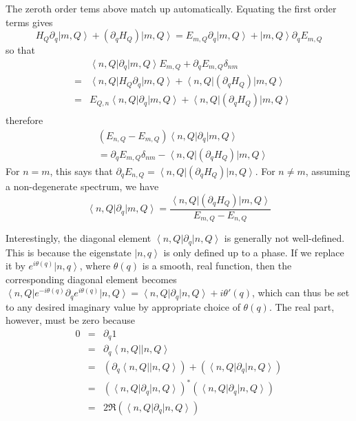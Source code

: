 \documentclass[aps,twocolumn,prb,floatfix,amsmath,amssymb,groupedaddress]{revtex4}
\begin{document}
The zeroth order tems above match up automatically.  Equating the first order terms gives
\[\!\!\!\!\!H_Q\partial_q\left|m,Q\right> + \left(\partial_qH_Q\right)\left|m,Q\right> = E_{m,Q}\partial_q\left|m,Q\right> + \left|m,Q\right>\partial_q E_{m,Q}\]
so that
\begin{eqnarray*}
& & \left<n,Q\right|\partial_q\left|m,Q\right> E_{m,Q} + \partial_q E_{m,Q} \delta_{nm} \\
& = & \left<n,Q\right|H_Q\partial_q\left|m,Q\right> + \left<n,Q\right|\left(\partial_q H_Q\right)\left|m,Q\right> \\
& = & E_{Q,n}\left<n,Q\right|\partial_q\left|m,Q\right> + \left<n,Q\right|\left(\partial_q H_Q\right)\left|m,Q\right> \\
\end{eqnarray*}
therefore
\begin{eqnarray*}
& \left(E_{n,Q}-E_{m,Q}\right) \left<n,Q\right|\partial_q\left|m,Q\right> \\
 & = \partial_q E_{m,Q}\delta_{nm}-\left<n,Q\right|\left(\partial_q H_Q\right)\left|m,Q\right>
\end{eqnarray*}
For $n=m$, this says that $\partial_q E_{n,Q} = \left<n,Q\right|\left(\partial_q H_Q\right)\left|n,Q\right>$.  For $n\neq m$, assuming a non-degenerate spectrum, we have 
\begin{equation}
\left<n,Q\right|\partial_q\left|m,Q\right> = \frac{\left<n,Q\right|\left(\partial_q H_Q\right)\left|m,Q\right>}{E_{m,Q}-E_{n,Q}}
\end{equation}

Interestingly, the diagonal element $\left<n,Q\right|\partial_q\left|n,Q\right>$ is generally not well-defined.  This is because the eigenstate $\left|n,q\right>$ is only defined up to a phase.  If we replace it by $e^{i\theta(q)}\left|n,q\right>$, where $\theta(q)$ is a smooth, real function, then the corresponding diagonal element becomes $\left<n,Q\right|e^{-i\theta(q)}\partial_qe^{i\theta(q)}\left|n,Q\right> = \left<n,Q\right|\partial_q\left|n,Q\right> + i\theta'(q)$, which can thus be set to any desired imaginary value by appropriate choice of $\theta(q)$.  The real part, however, must be zero because 
\begin{eqnarray*}
0 & = & \partial_q 1 \\
& = & \partial_q \left<n,Q\right|\left|n,Q\right> \\
& = & \left( \partial_q \left<n,Q\right|\left|n,Q\right>\right) + \left( \left<n,Q\right|\partial_q\left|n,Q\right>\right) \\
& = & \left( \left<n,Q\right|\partial_q\left|n,Q\right>\right)^* \left( \left<n,Q\right|\partial_q\left|n,Q\right>\right) \\
& = & 2 \Re\left( \left<n,Q\right|\partial_q\left|n,Q\right>\right)
\end{eqnarray*}
\end{document}

